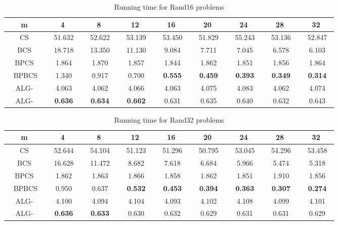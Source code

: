 \documentclass{llncs}
\newcommand{\rom}[1]{\uppercase\expandafter{\romannumeral #1\relax}}
\begin{document}
{\begin{table}
\begin{center}
\begin{tabular}{|c|c|c|c|c|c|c|c|c|}
\hline
m&4&8&12&16&20&24&28&32\\
\hline
CS &~ 51.632~ &~ 52.622~ &~ 53.139~ &~ 53.450~ &~ 51.829~ &~ 55.243~ &~ 53.136~ &~ 52.847~ \\
\hline
BCS &~ 18.718~ &~ 13.350~ &~ 11.130~ &~ 9.084~ &~ 7.711~ &~ 7.045~ &~ 6.578~ &~ 6.103~ \\
\hline
BPCS &~ 1.864~ &~ 1.870~ &~ 1.857~ &~ 1.844~ &~ 1.862~ &~ 1.851~ &~ 1.856~ &~ 1.864~ \\
\hline
~ BPBCS~ &~ 1.340~ &~ 0.917~ &~ 0.700~ &~ \textbf{0.555}~ &~ \textbf{0.459}~ &~ \textbf{0.393}~ &~ \textbf{0.349}~ &~ \textbf{0.314}~ \\
\hline 
ALG-\rom{2} &~ 4.063~ &~ 4.062~ &~ 4.066~ &~ 4.063~ &~ 4.075~ &~ 4.083~ &~ 4.062~ &~ 4.074~ \\
\hline
ALG-\rom{1} &~ \textbf{0.636}~ &~ \textbf{0.634}~ &~ \textbf{0.662}~ &~ 0.631~ &~ 0.635~ &~ 0.640~ &~ 0.632~ &~ 0.643~ \\
\hline
\end{tabular}
\caption{Running time for Rand16 problems}
\label{Rand16}
\end{center}
\end{table}




\begin{table}
\begin{center}
\begin{tabular}{|c|c|c|c|c|c|c|c|c|}
\hline
m&4&8&12&16&20&24&28&32\\
\hline
CS &~ 52.644~ &~ 54.104~ &~ 51.123~ &~ 51.296~ &~ 50.795~ &~ 53.045~ &~ 54.296~ &~ 53.458~ \\
\hline
BCS &~ 16.628~ &~ 11.472~ &~ 8.682~ &~ 7.618~ &~ 6.684~ &~ 5.966~ &~ 5.474~ &~ 5.318~ \\
\hline
BPCS &~ 1.862~ &~ 1.863~ &~ 1.866~ &~ 1.858~ &~ 1.862~ &~ 1.851~ &~ 1.910~ &~ 1.856~ \\
\hline
~ BPBCS~ &~ 0.950~ &~ 0.637~ &~ \textbf{0.532}~ &~ \textbf{0.453}~ &~ \textbf{0.394}~ &~ \textbf{0.363}~ &~ \textbf{0.307}~ &~ \textbf{0.274}~ \\
\hline 
ALG-\rom{2} &~ 4.100~ &~ 4.094~ &~ 4.104~ &~ 4.093~ &~ 4.102~ &~ 4.108~ &~ 4.099~ &~ 4.101~ \\
\hline
ALG-\rom{1} &~ \textbf{0.636}~ &~ \textbf{0.633}~ &~ 0.630~ &~ 0.632~ &~ 0.629~ &~ 0.631~ &~ 0.631~ &~ 0.629~ \\
\hline
\end{tabular}
\caption{Running time for Rand32 problems}
\label{Rand32}
\end{center}
\end{table}


}
\end{document}
